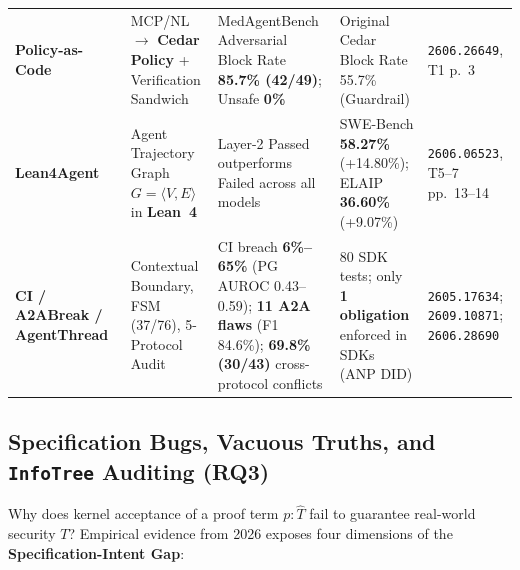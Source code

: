 \documentclass[10pt,twocolumn]{article}
\begin{document}
\begin{table}[tp]
\begin{tabularx}{\textwidth}{L{2.4cm} L{2.7cm} L{3.6cm} Y L{2.2cm}}
    \textbf{Policy-as-Code}~\cite{mondl2026policyascode} & MCP/NL $\to$ \textbf{Cedar Policy} + Verification Sandwich & MedAgentBench Adversarial Block Rate \textbf{85.7\% (42/49)}; Unsafe \textbf{0\%} & Original Cedar Block Rate 55.7\% (Guardrail) & \texttt{2606.26649}, T1 p.~3 \\
    \textbf{Lean4Agent}~\cite{wang2026lean4agent} & Agent Trajectory Graph $G = \langle V, E \rangle$ in \textbf{Lean~4} & Layer-2 Passed outperforms Failed across all models & SWE-Bench \textbf{58.27\%} (+14.80\%); ELAIP \textbf{36.60\%} (+9.07\%) & \texttt{2606.06523}, T5--7 pp.~13--14 \\
    \textbf{CI / A2ABreak / AgentThread}~\cite{abdelnabi2026ci,lotfi2026a2abreak,agentthread2026} & Contextual Boundary, FSM (37/76), 5-Protocol Audit & CI breach \textbf{6\%--65\%} (PG AUROC 0.43--0.59); \textbf{11 A2A flaws} (F1 84.6\%); \textbf{69.8\% (30/43)} cross-protocol conflicts & 80 SDK tests; only \textbf{1 obligation} enforced in SDKs (ANP DID) & \texttt{2605.17634}; \texttt{2609.10871}; \texttt{2606.28690} \\
    \bottomrule
  \end{tabularx}
\end{table}

\subsection{Specification Bugs, Vacuous Truths, and \texttt{InfoTree} Auditing (RQ3)}
\label{sec:rq3}

Why does kernel acceptance of a proof term $p : \hat{T}$ fail to guarantee real-world security $T$? Empirical evidence from 2026 exposes four dimensions of the \textbf{Specification-Intent Gap}:
\end{document}
